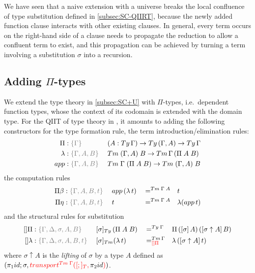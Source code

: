 \documentclass[a4paper,UKenglish,numberwithinsect,cleveref,thm-restate]{lipics-v2021}
\begin{document}
\begin{remark}
We have seen that a naive extension with a universe breaks the local confluence of type substitution defined in \cref{subsec:SC-QIIRT}, because the newly added function clause interacts with other existing clauses.
In general, every term occurs on the right-hand side of a clause needs to propagate the reduction to allow a confluent term to exist, and this propagation can be achieved by turning a term involving a substitution $\sigma$ into a recursion.
\end{remark}

\subsection{Adding \texorpdfstring{$\Pi$}{Π}-types} \label{subsec:SC+U+Pi}

We extend the type theory in \cref{subsec:SC+U} with $\Pi$-types, i.e.\ dependent function types, whose the context of its codomain is extended with the domain type.
For the QIIT of type theory in \cite{Altenkirch2016a}, it amounts to adding the following constructors for the type formation rule, the term introduction/elimination rules:
\begin{alignat*}{3}
  \Pi     &: \implicit{\Gamma}           \; && (A : \Ty\,\Gamma) \to \Ty\,(\Gamma, A) \to \Ty\,\Gamma \\
  \lambda &: \implicit{\Gamma, A, B}     \; && \Tm\;(\Gamma, A)\;B \to \Tm\,\Gamma\,(\Pi\;A\;B) \\
  \mathsf{app} &: \implicit{\Gamma, A, B}\; && \Tm\;\Gamma\;(\Pi\;A\;B) \to \Tm\;(\Gamma, A)\;B
\end{alignat*}
the computation rules
\begin{alignat*}{5}
  \Pi\beta           & : \implicit{\Gamma, A, B, t}\; && \mathsf{app}\,(\lambda\,t) && =^{\Tm\;\Gamma\;A} && t \\
  \Pi\eta            & : \implicit{\Gamma, A, B, t}\; && t                          && =^{\Tm\;\Gamma\;A} && \lambda(\mathsf{app}\,t)
\end{alignat*}
and the structural rules for substitution
\begin{alignat}{5}
  []\Pi              & : \implicit{\Gamma, \Delta, \sigma, A, B}\;    && [ \sigma ]_{\Ty}\,(\Pi\;A\;B) && =^{\Ty\;\Gamma} && \Pi\,(\sub{\sigma}{A})\,([\sigma\uparrow A]\,B) \label{eq:def-type-subst-8} \\
  \mathsf{[]\lambda} & : \implicit{\Gamma, \Delta, \sigma, A, B, t}\; && [\sigma]_{\Tm} (\lambda\,t) && =^{\Tm\,\Gamma}_{\alert{[]\Pi}} && \lambda\,([\sigma \uparrow A]\,t) \nonumber
\end{alignat}
where $\sigma \uparrow A$ is the \emph{lifting}  of $\sigma$ by a type $A$ defined as $(\pi_1\idS; \sigma, \alert{\transfib{\Tm\;\Gamma}{[;]_T}{\color{black}\pi_2\idS}})$. 
\end{document}
